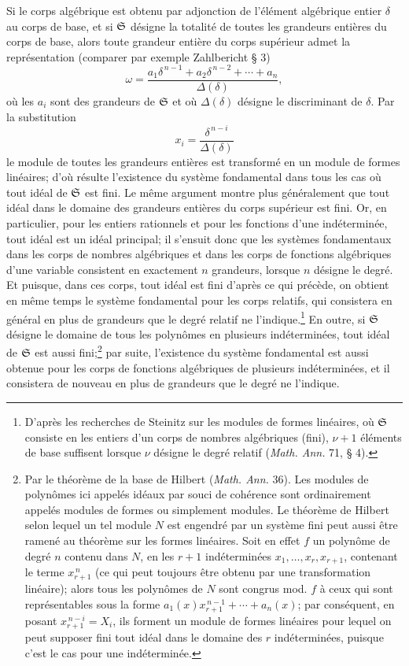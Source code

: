 Si le corps algébrique est obtenu par adjonction de l'élément algébrique entier \(\delta\) au corps de base, et si \(\mathfrak S\) désigne la totalité de toutes les grandeurs entières du corps de base, alors toute grandeur entière du corps supérieur admet la représentation (comparer par exemple Zahlbericht \S{} 3)
\[
\omega=\frac{a_1\delta^{\,n-1}+a_2\delta^{\,n-2}+\cdots+a_n}{\Delta(\delta)},
\]
où les \(a_i\) sont des grandeurs de \(\mathfrak S\) et où \(\Delta(\delta)\) désigne le discriminant de \(\delta\). Par la substitution
\[
x_i=\frac{\delta^{\,n-i}}{\Delta(\delta)}
\]
le module de toutes les grandeurs entières est transformé en un module de formes linéaires; d'où résulte l'existence du système fondamental dans tous les cas où tout idéal de \(\mathfrak S\) est fini. Le même argument montre plus généralement que tout idéal dans le domaine des grandeurs entières du corps supérieur est fini. Or, en particulier, pour les entiers rationnels et pour les fonctions d'une indéterminée, tout idéal est un idéal principal; il s'ensuit donc que les systèmes fondamentaux dans les corps de nombres algébriques et dans les corps de fonctions algébriques d'une variable consistent en exactement \(n\) grandeurs, lorsque \(n\) désigne le degré. Et puisque, dans ces corps, tout idéal est fini d'après ce qui précède, on obtient en même temps le système fondamental pour les corps relatifs, qui consistera en général en plus de grandeurs que le degré relatif ne l'indique.\footnote{D'après les recherches de Steinitz sur les modules de formes linéaires, où \(\mathfrak S\) consiste en les entiers d'un corps de nombres algébriques (fini), \(\nu+1\) éléments de base suffisent lorsque \(\nu\) désigne le degré relatif (\emph{Math. Ann.} 71, \S{} 4).} En outre, si \(\mathfrak S\) désigne le domaine de tous les polynômes en plusieurs indéterminées, tout idéal de \(\mathfrak S\) est aussi fini;\footnote{Par le théorème de la base de Hilbert (\emph{Math. Ann.} 36). Les modules de polynômes ici appelés idéaux par souci de cohérence sont ordinairement appelés \og{}modules de formes\fg{} ou simplement \og{}modules\fg{}. Le théorème de Hilbert selon lequel un tel module \(N\) est engendré par un système fini peut aussi être ramené au théorème sur les formes linéaires. Soit en effet \(f\) un polynôme de degré \(n\) contenu dans \(N\), en les \(r+1\) indéterminées \(x_1,\ldots,x_r,x_{r+1}\), contenant le terme \(x_{r+1}^{\,n}\) (ce qui peut toujours être obtenu par une transformation linéaire); alors tous les polynômes de \(N\) sont congrus mod. \(f\) à ceux qui sont représentables sous la forme \(a_1(x)x_{r+1}^{\,n-1}+\cdots+a_n(x)\); par conséquent, en posant \(x_{r+1}^{\,n-i}=X_i\), ils forment un module de formes linéaires pour lequel on peut supposer fini tout idéal dans le domaine des \(r\) indéterminées, puisque c'est le cas pour une indéterminée.} par suite, l'existence du système fondamental est aussi obtenue pour les corps de fonctions algébriques de plusieurs indéterminées, et il consistera de nouveau en plus de grandeurs que le degré ne l'indique.

